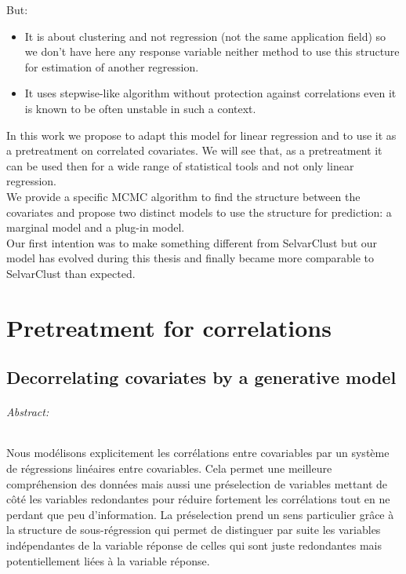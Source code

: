 \documentclass[12pt,a4paper]{report}
\begin{document}
			But:
			\begin{itemize}
				\item It is about clustering and not regression (not the same application field) so we don't have here any response variable neither method to use this structure for estimation of another regression. 
				\item It uses stepwise-like algorithm without protection against correlations \cite{raftery2006variable} even it is known to be often unstable \cite{miller2002subset} in such a context.
			\end{itemize}
			
			In this work we propose to adapt this model for linear regression and to use it as a pretreatment on correlated covariates. We will see that, as a pretreatment it can be used then for a wide range of statistical tools and not only linear regression.\\
			We provide a specific MCMC algorithm to find the structure between the covariates and propose two distinct models to use the structure for prediction: a marginal model and a plug-in model.	\\
			
	Our first intention was to make something different from SelvarClust but our model has evolved during this thesis and finally became more comparable to SelvarClust than expected.		
			
\part{Pretreatment for correlations}
\chapter{Decorrelating covariates by a generative model}
\paragraph{Abstract:} Nous modélisons explicitement les corrélations entre covariables par un système de régressions linéaires entre covariables. Cela permet une meilleure compréhension des données mais aussi une préselection de variables mettant de côté les variables redondantes pour réduire fortement les corrélations tout en ne perdant que peu d'information. La préselection prend un sens particulier grâce à la structure de sous-régression qui permet de distinguer par suite les variables indépendantes de la variable réponse de celles qui sont juste redondantes mais potentiellement liées à la variable réponse. 
\\
\end{document}
